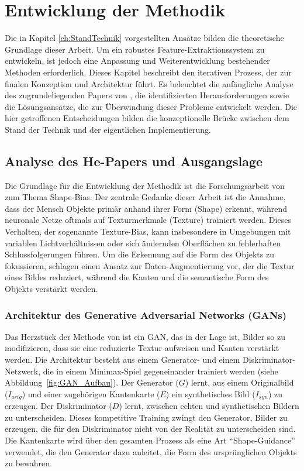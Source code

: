 \chapter{Entwicklung der Methodik}
\label{ch:EntwicklungDerMethodik}
Die in Kapitel \ref{ch:StandTechnik} vorgestellten Ansätze bilden die theoretische Grundlage dieser Arbeit. Um ein robustes Feature-Extraktionssystem zu entwickeln, ist jedoch eine Anpassung und Weiterentwicklung bestehender Methoden erforderlich. Dieses Kapitel beschreibt den iterativen Prozess, der zur finalen Konzeption und Architektur führt. Es beleuchtet die anfängliche Analyse des zugrundeliegenden Papers von \textcite{He_2023_ICCV}, die identifizierten Herausforderungen sowie die Lösungsansätze, die zur Überwindung dieser Probleme entwickelt werden. Die hier getroffenen Entscheidungen bilden die konzeptionelle Brücke zwischen dem Stand der Technik und der eigentlichen Implementierung.





\section{Analyse des He-Papers und Ausgangslage}
\label{sec:Analyse}
Die Grundlage für die Entwicklung der Methodik ist die Forschungsarbeit von \textcite{He_2023_ICCV} zum Thema Shape-Bias. Der zentrale Gedanke dieser Arbeit ist die Annahme, dass der Mensch Objekte primär anhand ihrer Form (Shape) erkennt, während neuronale Netze oftmals auf Texturmerkmale (Texture) trainiert werden. Dieses Verhalten, der sogenannte Texture-Bias, kann insbesondere in Umgebungen mit variablen Lichtverhältnissen oder sich ändernden Oberflächen zu fehlerhaften Schlussfolgerungen führen. Um die Erkennung auf die Form des Objekts zu fokussieren, schlagen \textcite{He_2023_ICCV} einen Ansatz zur Daten-Augmentierung vor, der die Textur eines Bildes reduziert, während die Kanten und die semantische Form des Objekts verstärkt werden.

\subsection{Architektur des Generative Adversarial Networks (GANs)}
Das Herzstück der Methode von \textcite{He_2023_ICCV} ist ein \ac{GAN}, das in der Lage ist, Bilder so zu modifizieren, dass sie eine reduzierte Textur aufweisen und Kanten verstärkt werden. Die Architektur besteht aus einem Generator- und einem Diskriminator-Netzwerk, die in einem Minimax-Spiel gegeneinander trainiert werden (siehe Abbildung~\ref{fig:GAN_Aufbau}). Der Generator ($G$) lernt, aus einem Originalbild ($I_{orig}$) und einer zugehörigen Kantenkarte ($E$) ein synthetisches Bild ($I_{syn}$) zu erzeugen. Der Diskriminator ($D$) lernt, zwischen echten und synthetischen Bildern zu unterscheiden. Dieses kompetitive Training zwingt den Generator, Bilder zu erzeugen, die für den Diskriminator nicht von der Realität zu unterscheiden sind. Die Kantenkarte wird über den gesamten Prozess als eine Art \enquote{Shape-Guidance} verwendet, die den Generator dazu anleitet, die Form des ursprünglichen Objekts zu bewahren.


